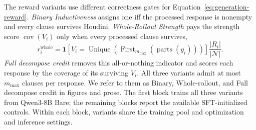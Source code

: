 The reward variants use different correctness gates for
Equation~\ref{eq:generation-reward}.  \emph{Binary Inductiveness} assigns one
iff the processed response is nonempty and every clause survives Houdini.
\emph{Whole-Rollout Strength} pays the strength score
\(\operatorname{cov}(V_i)\) only when every processed clause survives,
\[
  r_i^{\mathrm{whole}}
  =\mathbf 1[V_i=
    \operatorname{Unique}(\operatorname{First}_{m_{\max}}(
      \operatorname{parts}(y_i)))]
   \frac{|R_i|}{|\mathcal N|}.
\]
\emph{Full decompose credit} removes this all-or-nothing indicator and
scores each response by the coverage of its surviving \(V_i\).  All three
variants admit at most \(m_{\max}\) clauses per response.  We refer to them as
Binary, Whole-rollout, and Full decompose credit in figures and prose.
The first block trains all three variants from Qwen3-8B Bare; the remaining
blocks report the available SFT-initialized controls.  Within each block,
variants share the training pool and optimization and inference settings.

